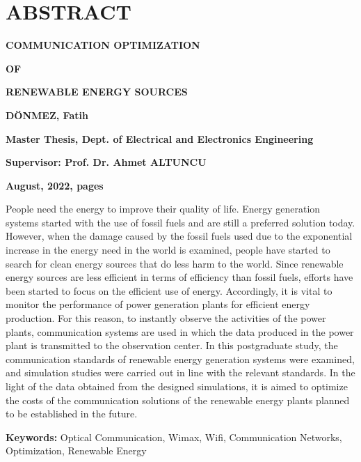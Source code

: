 \chapter*{\vspace{2 cm}\hfill{\centering ABSTRACT}\hfill}
\singlespacing



\centerline{\textbf {COMMUNICATION OPTIMIZATION}}
\centerline{\textbf {OF}}
\centerline{\textbf {RENEWABLE ENERGY SOURCES}}

\vspace{.5 cm}
\centerline{\textbf {DÖNMEZ, Fatih}}
\centerline{\textbf {Master Thesis, Dept. of Electrical and Electronics Engineering}}
\centerline{\textbf {Supervisor: Prof. Dr. Ahmet ALTUNCU}}
\centerline{\textbf {August, 2022, \pageref{LastPage} pages}}

\vspace{.5 cm}
\onehalfspacing

People need the energy to improve their quality of life. Energy generation systems started with the use of fossil fuels and are still a preferred solution today. However, when the damage caused by the fossil fuels used due to the exponential increase in the energy need in the world is examined, people have started to search for clean energy sources that do less harm to the world. Since renewable energy sources are less efficient in terms of efficiency than fossil fuels, efforts have been started to focus on the efficient use of energy. Accordingly, it is vital to monitor the performance of power generation plants for efficient energy production. For this reason, to instantly observe the activities of the power plants, communication systems are used in which the data produced in the power plant is transmitted to the observation center. In this postgraduate study, the communication standards of renewable energy generation systems were examined, and simulation studies were carried out in line with the relevant standards. In the light of the data obtained from the designed simulations, it is aimed to optimize the costs of the communication solutions of the renewable energy plants planned to be established in the future.


\textbf{Keywords: } Optical Communication, Wimax, Wifi, Communication Networks, Optimization, Renewable Energy